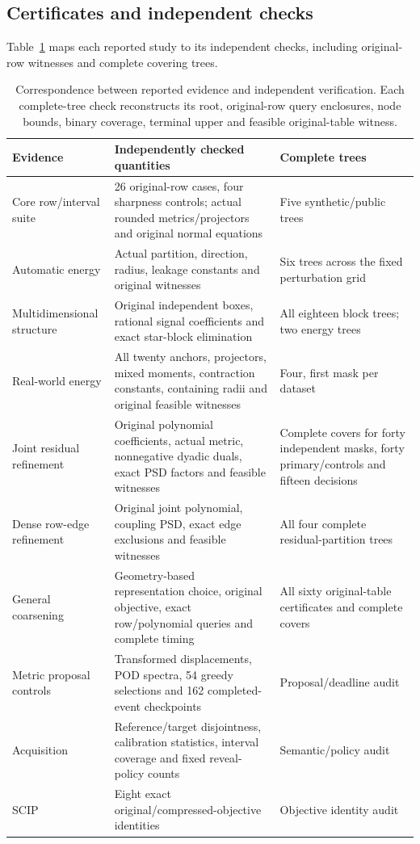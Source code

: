 \subsection{Certificates and independent checks}\label{app:verification-ledger}
Table~\ref{tab:verification-ledger} maps each reported study to its independent checks, including original-row witnesses and complete covering trees.
\begin{table}[t]\centering\small\setlength{\tabcolsep}{4pt}
\caption{Correspondence between reported evidence and independent verification. Each complete-tree check reconstructs its root, original-row query enclosures, node bounds, binary coverage, terminal upper and feasible original-table witness.}\label{tab:verification-ledger}
\begin{tabular}{p{}p{}p{}}\toprule
Evidence&Independently checked quantities&Complete trees\\\midrule
Core row/interval suite&26 original-row cases, four sharpness controls; actual rounded metrics/projectors and original normal equations&Five synthetic/public trees\\
Automatic energy&Actual partition, direction, radius, leakage constants and original witnesses&Six trees across the fixed perturbation grid\\
Multidimensional structure&Original independent boxes, rational signal coefficients and exact star-block elimination&All eighteen block trees; two energy trees\\
Real-world energy&All twenty anchors, projectors, mixed moments, contraction constants, containing radii and original feasible witnesses&Four, first mask per dataset\\
Joint residual refinement&Original polynomial coefficients, actual metric, nonnegative dyadic duals, exact PSD factors and feasible witnesses&Complete covers for forty independent masks, forty primary/controls and fifteen decisions\\
Dense row-edge refinement&Original joint polynomial, coupling PSD, exact edge exclusions and feasible witnesses&All four complete residual-partition trees\\
General coarsening&Geometry-based representation choice, original objective, exact row/polynomial queries and complete timing&All sixty original-table certificates and complete covers\\
Metric proposal controls&Transformed displacements, POD spectra, 54 greedy selections and 162 completed-event checkpoints&Proposal/deadline audit\\
Acquisition&Reference/target disjointness, calibration statistics, interval coverage and fixed reveal-policy counts&Semantic/policy audit\\
SCIP&Eight exact original/compressed-objective identities&Objective identity audit\\
\bottomrule\end{tabular}\end{table}
